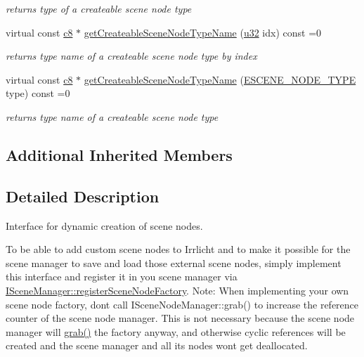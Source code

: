 \begin{DoxyCompactItemize}
\begin{DoxyCompactList}\small\item\em returns type of a createable scene node type \end{DoxyCompactList}\item 
virtual const \hyperlink{namespaceirr_a9395eaea339bcb546b319e9c96bf7410}{c8} $\ast$ \hyperlink{classirr_1_1scene_1_1ISceneNodeFactory_a259f156cc367a9a89f79159ad2b665ac}{get\+Createable\+Scene\+Node\+Type\+Name} (\hyperlink{namespaceirr_a0416a53257075833e7002efd0a18e804}{u32} idx) const =0
\begin{DoxyCompactList}\small\item\em returns type name of a createable scene node type by index \end{DoxyCompactList}\item 
virtual const \hyperlink{namespaceirr_a9395eaea339bcb546b319e9c96bf7410}{c8} $\ast$ \hyperlink{classirr_1_1scene_1_1ISceneNodeFactory_addc09a5ab7a8d8b65182fbaa09c88b6f}{get\+Createable\+Scene\+Node\+Type\+Name} (\hyperlink{namespaceirr_1_1scene_acad3d7ef92a9807d391ba29120f3b7bd}{E\+S\+C\+E\+N\+E\+\_\+\+N\+O\+D\+E\+\_\+\+T\+Y\+PE} type) const =0
\begin{DoxyCompactList}\small\item\em returns type name of a createable scene node type \end{DoxyCompactList}\end{DoxyCompactItemize}
\subsection*{Additional Inherited Members}


\subsection{Detailed Description}
Interface for dynamic creation of scene nodes. 

To be able to add custom scene nodes to Irrlicht and to make it possible for the scene manager to save and load those external scene nodes, simply implement this interface and register it in you scene manager via \hyperlink{classirr_1_1scene_1_1ISceneManager_a75ac9315def74ae5e26a2d6a2f5a38e9}{I\+Scene\+Manager\+::register\+Scene\+Node\+Factory}. Note\+: When implementing your own scene node factory, don\textquotesingle{}t call I\+Scene\+Node\+Manager\+::grab() to increase the reference counter of the scene node manager. This is not necessary because the scene node manager will \hyperlink{classirr_1_1IReferenceCounted_a396f9cdbe311ada278626477b3c6f0f5}{grab()} the factory anyway, and otherwise cyclic references will be created and the scene manager and all its nodes won\textquotesingle{}t get deallocated. 

